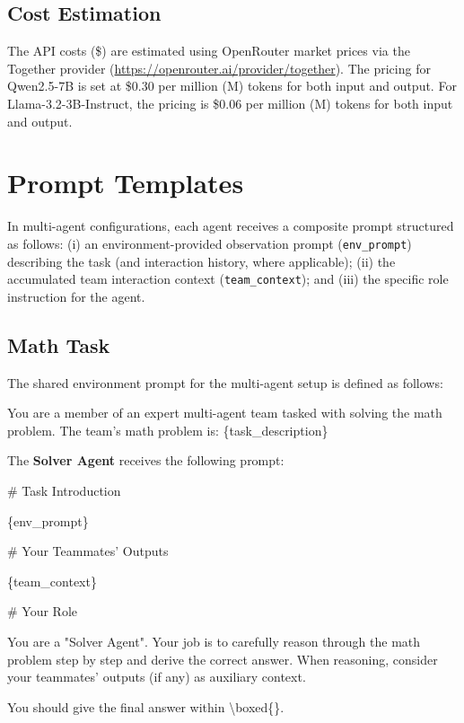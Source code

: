 \documentclass[]{fairmeta}
\theoremstyle{plain}
\theoremstyle{definition}
\theoremstyle{remark}
\begin{document}
\subsection{Cost Estimation}
The API costs (\$) are estimated using OpenRouter market prices via the Together provider (\url{https://openrouter.ai/provider/together}). The pricing for Qwen2.5-7B is set at \$0.30 per million (M) tokens for both input and output. For Llama-3.2-3B-Instruct, the pricing is \$0.06 per million (M) tokens for both input and output.

\section{Prompt Templates}

In multi-agent configurations, each agent receives a composite prompt structured as follows:
(i) an environment-provided observation prompt (\texttt{env\_prompt}) describing the task (and interaction history, where applicable);
(ii) the accumulated team interaction context (\texttt{team\_context}); and
(iii) the specific role instruction for the agent.

\subsection{Math Task}
The shared environment prompt for the multi-agent setup is defined as follows:

\begin{promptbox}[title=Environment Prompt]
You are a member of an expert multi-agent team tasked with solving the math problem.
The team's math problem is: \{task\_description\}
\end{promptbox}

The \textbf{Solver Agent} receives the following prompt:

\begin{promptbox}[title=Solver Agent Prompt]
\# Task Introduction

\{env\_prompt\}

\# Your Teammates' Outputs

\{team\_context\}

\# Your Role

You are a "Solver Agent". Your job is to carefully reason through the math problem step by step and derive the correct answer. When reasoning, consider your teammates' outputs (if any) as auxiliary context.

You should give the final answer within \textbackslash boxed\{\}.
\end{promptbox}
\end{document}
